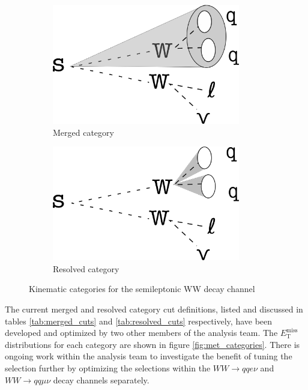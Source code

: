 \documentclass[12pt]{article}
\newcommand*{\met}{\ensuremath{E_\text{T}^\text{miss}} }
\begin{document}
\begin{figure}[H]
     \centering
     \begin{subfigure}[b]{0.4\textwidth}
         \centering
         \includegraphics[width=0.9\textwidth]{figures/merged.png}
         \caption[]{Merged category}
         \label{fig:merged}
     \end{subfigure}
     \hfill
     \begin{subfigure}[b]{0.4\textwidth}
         \centering
         \includegraphics[width=0.9\textwidth]{figures/resolved.png}
         \caption[]{Resolved category}
         \label{fig:resolved}
     \end{subfigure}
\caption[]{Kinematic categories for the semileptonic WW decay channel}
\label{fig:lep_categories}
\end{figure}

The current merged and resolved category cut definitions, listed and discussed in tables \ref{tab:merged_cuts} and \ref{tab:resolved_cuts} respectively, have been developed and optimized by two other members of the analysis team. The \met distributions for each category are shown in figure \ref{fig:met_categories}. There is ongoing work within the analysis team to investigate the benefit of tuning the selection further by optimizing the selections within the $WW\rightarrow qqe\nu$ and $WW\rightarrow qq\mu\nu$ decay channels separately.
\end{document}
